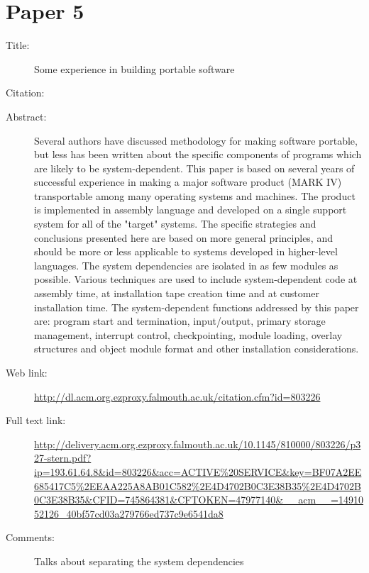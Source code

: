 \documentclass{scrartcl}
\begin{document}
\section*{Paper 5}
\begin{description}
\item[Title:] Some experience in building portable software
\item[Citation:] \cite{stern1978some}
\item[Abstract:] Several authors have discussed methodology for making software portable, but less has been written about the specific components of programs which are likely to be system-dependent. This paper is based on several years of successful experience in making a major software product (MARK IV) transportable among many operating systems and machines. The product is implemented in assembly language and developed on a single support system for all of the "target" systems. The specific strategies and conclusions presented here are based on more general principles, and should be more or less applicable to systems developed in higher-level languages. The system dependencies are isolated in as few modules as possible. Various techniques are used to include system-dependent code at assembly time, at installation tape creation time and at customer installation time. The system-dependent functions addressed by this paper are: program start and termination, input/output, primary storage management, interrupt control, checkpointing, module loading, overlay structures and object module format and other installation considerations.
\item[Web link:] \url{http://dl.acm.org.ezproxy.falmouth.ac.uk/citation.cfm?id=803226}
\item[Full text link:] \url{http://delivery.acm.org.ezproxy.falmouth.ac.uk/10.1145/810000/803226/p327-stern.pdf?ip=193.61.64.8&id=803226&acc=ACTIVE%20SERVICE&key=BF07A2EE685417C5%2EEAA225A8AB01C582%2E4D4702B0C3E38B35%2E4D4702B0C3E38B35&CFID=745864381&CFTOKEN=47977140&__acm__=1491052126_40bf57cd03a279766ed737c9e6541da8}
\item[Comments:] Talks about separating the system dependencies 
\end{description}



\end{document}
